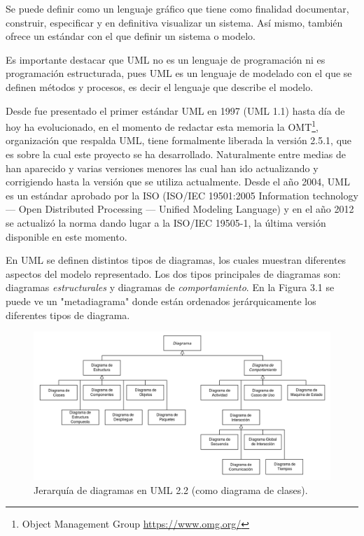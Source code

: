 \documentclass[a4paper, 12pt]{book}
\begin{document}
Se puede definir como un lenguaje gráfico que tiene como finalidad documentar, construir, especificar y en definitiva visualizar un sistema. Así mismo, también ofrece un estándar con el que definir un sistema o modelo. 

Es importante destacar que UML no es un lenguaje de programación ni es programación estructurada, pues UML es un lenguaje de modelado con el que se definen métodos y procesos, es decir el lenguaje que describe el modelo.

Desde fue presentado el primer estándar UML en 1997 (UML 1.1) hasta día de hoy ha evolucionado, en el momento de redactar esta memoria la OMT\footnote{Object Management Group \url{https://www.omg.org/}}, organización que respalda UML, tiene formalmente liberada la versión 2.5.1, que es sobre la cual este proyecto se ha desarrollado.
Naturalmente entre medias de han aparecido y varias versiones menores las cual han ido actualizando y corrigiendo hasta la versión que se utiliza actualmente. Desde el año 2004, UML es un estándar aprobado por la ISO (ISO/IEC 19501:2005 Information technology — Open Distributed Processing — Unified Modeling Language) y en el año 2012 se actualizó la norma dando lugar a la ISO/IEC 19505-1, la última versión disponible en este momento.

En UML se definen distintos tipos de diagramas, los cuales muestran diferentes aspectos del modelo representado. 
Los dos tipos principales de diagramas son: diagramas \emph{estructurales} y diagramas de \emph{comportamiento}. En la Figura 3.1 se puede ve un "metadiagrama" donde están ordenados jerárquicamente los diferentes tipos de diagrama. 

\begin{figure}
	\centering
	\includegraphics[width=16cm, keepaspectratio]{img/Uml_diagram.png}
	\caption{Jerarquía de diagramas en UML 2.2 (como diagrama de clases).}\label{fig:Uml_diagram}
\end{figure}
\end{document}
